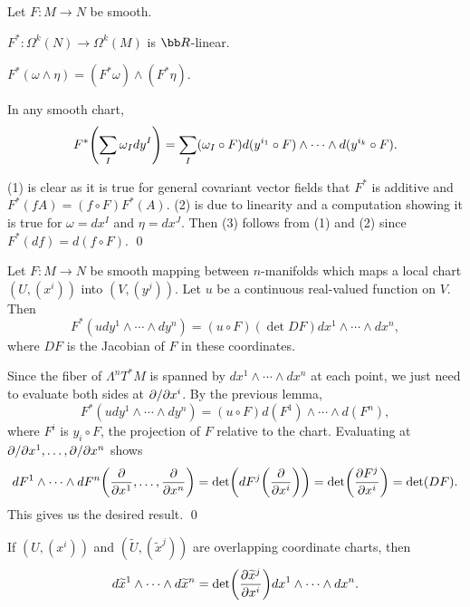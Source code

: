 \blemm

    Let $F\colon M\to N$ be smooth.
    \benum
        \item $F^*\colon\Omega^k(N)\to\Omega^k(M)$ is $\bR$-linear.
        \item $F^*(\omega\wedge\eta)=(F^*\omega)\wedge(F^*\eta)$.
        \item In any smooth chart,
        $$ F^*\mathopen{}\mathclose{\left(\sum_I\omega_Idy^I\right)} = \sum_I(\omega_I\circ F)d(y^{i_1}\circ F)\wedge\cdots\wedge d(y^{i_k}\circ F) . $$
    \eenum

\elemm

\bproof

    (1) is clear as it is true for general covariant vector fields that $F^*$ is additive and $F^*(fA)=(f\circ F)F^*(A)$.
    (2) is due to linearity and a computation showing it is true for $\omega=dx^I$ and $\eta=dx^J$.
    Then (3) follows from (1) and (2) since $F^*(df)=d(f\circ F)$.
    \qed

\eproof

\blemm

    Let $F\colon M\to N$ be smooth mapping between $n$-manifolds which maps a local chart $(U,(x^i))$ into $(V,(y^j))$.
    Let $u$ be a continuous real-valued function on $V$.
    Then
    $$ F^*(udy^1\wedge\cdots\wedge dy^n) = (u\circ F)(\det DF)dx^1\wedge\cdots\wedge dx^n , $$
    where $DF$ is the Jacobian of $F$ in these coordinates.

\elemm

\bproof

    Since the fiber of $\Lambda^nT^*M$ is spanned by $dx^1\wedge\cdots\wedge dx^n$ at each point, we just need to evaluate both sides at $\partial /\partial x^i$.
    By the previous lemma,
    $$ F^*(udy^1\wedge\cdots\wedge dy^n) = (u\circ F)d(F^1)\wedge\cdots\wedge d(F^n) , $$
    where $F^i$ is $y_i\circ F$, the projection of $F$ relative to the chart.
    Evaluating at $\partial /\partial x^1,\dots,\partial /\partial x^n$ shows
    $$ dF^1\wedge\cdots\wedge dF^n\mathopen{}\mathclose{\left({{\partial }\over{\partial x^1}},\dots,{{\partial }\over{\partial x^n}}\right)} = \mathop{\rm det}\nolimits\mathopen{}\mathclose{\left(dF^j\mathopen{}\mathclose{\left({{\partial }\over{\partial x^i}}\right)}\right)} = \mathop{\rm det}\nolimits\mathopen{}\mathclose{\left({{\partial F^j}\over{\partial x^i}}\right)} = \mathop{\rm det}\nolimits(DF) . $$
    This gives us the desired result.
    \qed

\eproof

\bcoro

    If $(U,(x^i))$ and $(\tilde U,(\tilde x^j))$ are overlapping coordinate charts, then
    $$ d\widetilde x^1\wedge\cdots\wedge d\widetilde x^n = \mathop{\rm det}\nolimits\mathopen{}\mathclose{\left({{\partial \widetilde x^j}\over{\partial x^i}}\right)}dx^1\wedge\cdots\wedge dx^n . $$

\ecoro

